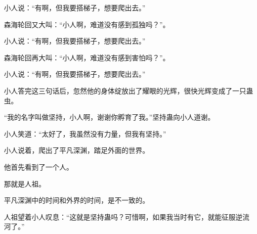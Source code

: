 \begin{this_body}
小人说：“有啊，但我要搭梯子，想要爬出去。”

森海轮回又大叫：“小人啊，难道没有感到孤独吗？”。

小人说：“有啊，但我要搭梯子，想要爬出去。”

森海轮回再大叫：“小人啊，难道没有感到害怕吗？”。

小人说：“有啊，但我要搭梯子，想要爬出去。”

小人答完这三句话后，忽然他的身体绽放出了耀眼的光辉，很快光辉变成了一只蛊虫。

“我的名字叫做坚持，小人啊，谢谢你孵育了我。”坚持蛊向小人道谢。

小人笑道：“太好了，我虽然没有力量，但我有坚持。”

小人说着，爬出了平凡深渊，踏足外面的世界。

他首先看到了一个人。

那就是人祖。

平凡深渊中的时间和外界的时间，是不一致的。

人祖望着小人叹息：“这就是坚持蛊吗？可惜啊，如果我当时有它，就能征服逆流河了。”

\end{this_body}

